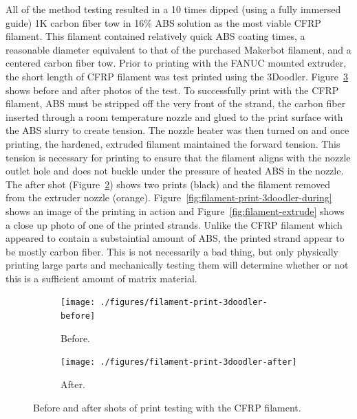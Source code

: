 All of the method testing resulted in a 10 times dipped (using a fully immersed guide) 1K carbon fiber tow in 16\% ABS solution as the most viable CFRP filament. This filament contained relatively quick ABS coating times, a reasonable diameter equivalent to that of the purchased Makerbot filament, and a centered carbon fiber tow. Prior to printing with the FANUC mounted extruder, the short length of CFRP filament was test printed using the 3Doodler. Figure~\ref{fig:filament-print-test} shows before and after photos of the test. To successfully print with the CFRP filament, ABS must be stripped off the very front of the strand, the carbon fiber inserted through a room temperature nozzle and glued to the print surface with the ABS slurry to create tension. The nozzle heater was then turned on and once printing, the hardened, extruded filament maintained the forward tension. This tension is necessary for printing to ensure that the filament aligns with the nozzle outlet hole and does not buckle under the pressure of heated ABS in the nozzle. The after shot (Figure~\ref{fig:filament-print-3doodler-after}) shows two prints (black) and the filament removed from the extruder nozzle (orange). Figure~\ref{fig:filament-print-3doodler-during} shows an image of the printing in action and Figure~\ref{fig:filament-extrude} shows a close up photo of one of the printed strands. Unlike the CFRP filament which appeared to contain a substaintial amount of ABS, the printed strand appear to be mostly carbon fiber. This is not necessarily a bad thing, but only physically printing large parts and mechanically testing them will determine whether or not this is a sufficient amount of matrix material. \\

\indent

\begin{figure}[h!]
        \centering
        \begin{subfigure}[b]{0.3\textwidth}
                \texttt{[image: ./figures/filament-print-3doodler-before]}
                \caption{Before.}
                \label{fig:filament-print-3doodler-before}
        \end{subfigure}
        \begin{subfigure}[b]{0.3\textwidth}
                \texttt{[image: ./figures/filament-print-3doodler-after]}
                \caption{After.}
                \label{fig:filament-print-3doodler-after}
        \end{subfigure}
        \caption{Before and after shots of print testing with the CFRP filament.}\label{fig:filament-print-test}
\end{figure}

